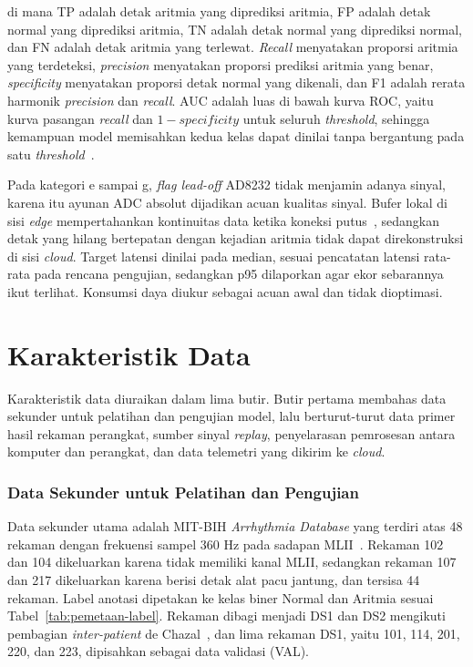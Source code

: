 \noindent di mana TP adalah detak aritmia yang diprediksi aritmia, FP adalah detak normal yang diprediksi aritmia, TN adalah detak normal yang diprediksi normal, dan FN adalah detak aritmia yang terlewat. \textit{Recall} menyatakan proporsi aritmia yang terdeteksi, \textit{precision} menyatakan proporsi prediksi aritmia yang benar, \textit{specificity} menyatakan proporsi detak normal yang dikenali, dan F1 adalah rerata harmonik \textit{precision} dan \textit{recall}. AUC adalah luas di bawah kurva ROC, yaitu kurva pasangan \textit{recall} dan $1 - \textit{specificity}$ untuk seluruh \textit{threshold}, sehingga kemampuan model memisahkan kedua kelas dapat dinilai tanpa bergantung pada satu \textit{threshold}~\cite{chicco_2020}.

Pada kategori e sampai g, \textit{flag lead-off} AD8232 tidak menjamin adanya sinyal, karena itu ayunan ADC absolut dijadikan acuan kualitas sinyal. Bufer lokal di sisi \textit{edge} mempertahankan kontinuitas data ketika koneksi putus~\cite{escobedo_2026, tipparaju_2021}, sedangkan detak yang hilang bertepatan dengan kejadian aritmia tidak dapat direkonstruksi di sisi \textit{cloud}. Target latensi dinilai pada median, sesuai pencatatan latensi rata-rata pada rencana pengujian, sedangkan p95 dilaporkan agar ekor sebarannya ikut terlihat. Konsumsi daya diukur sebagai acuan awal dan tidak dioptimasi.

\section{Karakteristik Data}

Karakteristik data diuraikan dalam lima butir. Butir pertama membahas data sekunder untuk pelatihan dan pengujian model, lalu berturut-turut data primer hasil rekaman perangkat, sumber sinyal \textit{replay}, penyelarasan pemrosesan antara komputer dan perangkat, dan data telemetri yang dikirim ke \textit{cloud}.

\subsubsection{Data Sekunder untuk Pelatihan dan Pengujian}

Data sekunder utama adalah MIT-BIH \textit{Arrhythmia Database} yang terdiri atas 48 rekaman dengan frekuensi sampel 360 Hz pada sadapan MLII~\cite{moody_mark_2001}. Rekaman 102 dan 104 dikeluarkan karena tidak memiliki kanal MLII, sedangkan rekaman 107 dan 217 dikeluarkan karena berisi detak alat pacu jantung, dan tersisa 44 rekaman. Label anotasi dipetakan ke kelas biner Normal dan Aritmia sesuai Tabel~\ref{tab:pemetaan-label}. Rekaman dibagi menjadi DS1 dan DS2 mengikuti pembagian \textit{inter-patient} de Chazal~\cite{dechazal_2004}, dan lima rekaman DS1, yaitu 101, 114, 201, 220, dan 223, dipisahkan sebagai data validasi (VAL).


